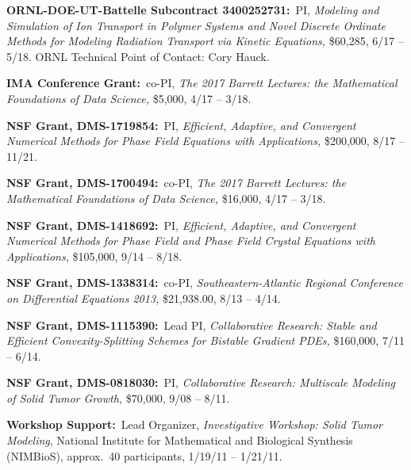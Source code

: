 \documentclass[11pt]{letter}
\begin{document}
\begin{description}
    \item
\textbf{ORNL-DOE-UT-Battelle Subcontract 3400252731:}~PI, {\sl Modeling and Simulation of Ion Transport in Polymer Systems and Novel Discrete Ordinate Methods for Modeling Radiation Transport via Kinetic Equations,} \$60,285, 6/17 -- 5/18. ORNL Technical Point of Contact: Cory Hauck. 



    \item
\textbf{IMA Conference Grant:}~co-PI, {\sl The 2017 Barrett Lectures: the Mathematical Foundations of Data Science,} \$5,000, 4/17 -- 3/18.


    \item
\textbf{NSF Grant, DMS-1719854:}~PI, {\sl Efficient, Adaptive, and Convergent Numerical Methods for Phase Field Equations with Applications,} \$200,000, 8/17 -- 11/21.


	 \item
\textbf{NSF Grant, DMS-1700494:}~co-PI, {\sl The 2017 Barrett Lectures: the Mathematical Foundations of Data Science,} \$16,000, 4/17 -- 3/18.

    \item
\textbf{NSF Grant, DMS-1418692:}~PI, {\sl Efficient, Adaptive, and Convergent Numerical Methods for Phase Field and Phase Field Crystal Equations with Applications,} \$105,000, 9/14 -- 8/18.

    \item
\textbf{NSF Grant, DMS-1338314:}~co-PI, {\sl Southeastern-Atlantic Regional Conference on Differential Equations 2013,} \$21,938.00, 8/13 -- 4/14.

    \item
\textbf{NSF Grant, DMS-1115390:}~Lead PI, {\sl Collaborative Research: Stable and Efficient Convexity-Splitting Schemes for Bistable Gradient PDEs,} \$160,000, 7/11 -- 6/14.

    \item
\textbf{NSF Grant, DMS-0818030:}~PI, {\sl Collaborative Research: Multiscale Modeling of Solid Tumor Growth,} \$70,000, 9/08 -- 8/11.
	
	\item
\textbf{Workshop Support:}~Lead Organizer, {\sl Investigative Workshop: Solid Tumor Modeling}, National Institute for Mathematical and Biological Synthesis (NIMBioS), approx.~40 participants, 1/19/11 -- 1/21/11.
	

\end{description}
\end{document}
